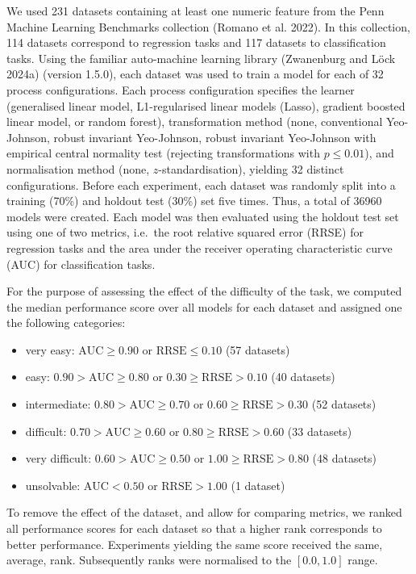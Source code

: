 \documentclass[
  a4paper,
]{article}
\providecommand{\tightlist}{%
  \setlength{\itemsep}{0pt}\setlength{\parskip}{0pt}}
\begin{document}
We used 231 datasets containing at least one numeric feature from the
Penn Machine Learning Benchmarks collection (Romano et al. 2022). In
this collection, 114 datasets correspond to regression tasks and 117
datasets to classification tasks. Using the familiar auto-machine
learning library (Zwanenburg and Löck 2024a) (version 1.5.0), each
dataset was used to train a model for each of 32 process configurations.
Each process configuration specifies the learner (generalised linear
model, L1-regularised linear models (Lasso), gradient boosted linear
model, or random forest), transformation method (none, conventional
Yeo-Johnson, robust invariant Yeo-Johnson, robust invariant Yeo-Johnson
with empirical central normality test (rejecting transformations with
\(p \leq 0.01\)), and normalisation method (none,
\(z\)-standardisation), yielding 32 distinct configurations. Before each
experiment, each dataset was randomly split into a training (70\%) and
holdout test (30\%) set five times. Thus, a total of 36960 models were
created. Each model was then evaluated using the holdout test set using
one of two metrics, i.e.~the root relative squared error (RRSE) for
regression tasks and the area under the receiver operating
characteristic curve (AUC) for classification tasks.

For the purpose of assessing the effect of the difficulty of the task,
we computed the median performance score over all models for each
dataset and assigned one the following categories:

\begin{itemize}
\tightlist
\item
  very easy: \(\text{AUC} \geq 0.90\) or \(\text{RRSE} \leq 0.10\) (57
  datasets)
\item
  easy: \(0.90 > \text{AUC} \geq 0.80\) or
  \(0.30 \geq \text{RRSE} > 0.10\) (40 datasets)
\item
  intermediate: \(0.80 > \text{AUC} \geq 0.70\) or
  \(0.60 \geq \text{RRSE} > 0.30\) (52 datasets)
\item
  difficult: \(0.70 > \text{AUC} \geq 0.60\) or
  \(0.80 \geq \text{RRSE} > 0.60\) (33 datasets)
\item
  very difficult: \(0.60 > \text{AUC} \geq 0.50\) or
  \(1.00 \geq \text{RRSE} > 0.80\) (48 datasets)
\item
  unsolvable: \(\text{AUC} < 0.50\) or \(\text{RRSE} > 1.00\) (1
  dataset)
\end{itemize}

To remove the effect of the dataset, and allow for comparing metrics, we
ranked all performance scores for each dataset so that a higher rank
corresponds to better performance. Experiments yielding the same score
received the same, average, rank. Subsequently ranks were normalised to
the \([0.0, 1.0]\) range.
\end{document}
